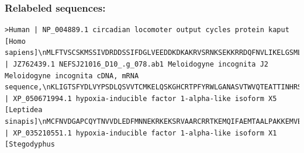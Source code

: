 \documentclass[
  letterpaper,
  DIV=11,
  numbers=noendperiod]{scrartcl}
\begin{document}
\hypertarget{relabeled-sequences}{%
\subsubsection{Relabeled sequences:}\label{relabeled-sequences}}

\begin{verbatim}
>Human | NP_004889.1 circadian locomoter output cycles protein kaput [Homo sapiens]\nMLFTVSCSKMSSIVDRDDSSIFDGLVEEDDKDKAKRVSRNKSEKKRRDQFNVLIKELGSMLPGNARKMDK\nSTVLQKSIDFLRKHKEITAQSDASEIRQDWKPTFLSNEEFTQLMLEALDGFFLAIMTDGSIIYVSESVTS\nLLEHLPSDLVDQSIFNFIPEGEHSEVYKILSTHLLESDSLTPEYLKSKNQLEFCCHMLRGTIDPKEPSTY\nEYVKFIGNFKSLNSVSSSAHNGFEGTIQRTHRPSYEDRVCFVATVRLATPQFIKEMCTVEEPNEEFTSRH\nSLEWKFLFLDHRAPPIIGYLPFEVLGTSGYDYYHVDDLENLAKCHEHLMQYGKGKSCYYRFLTKGQQWIW\nLQTHYYITYHQWNSRPEFIVCTHTVVSYAEVRAERRRELGIEESLPETAADKSQDSGSDNRINTVSLKEA\nLERFDHSPTPSASSRSSRKSSHTAVSDPSSTPTKIPTDTSTPPRQHLPAHEKMVQRRSSFSSQSINSQSV\nGSSLTQPVMSQATNLPIPQGMSQFQFSAQLGAMQHLKDQLEQRTRMIEANIHRQQEELRKIQEQLQMVHG\nQGLQMFLQQSNPGLNFGSVQLSSGNSSNIQQLAPINMQGQVVPTNQIQSGMNTGHIGTTQHMIQQQTLQS\nTSTQSQQNVLSGHSQQTSLPSQTQSTLTAPLYNTMVISQPAAGSMVQIPSSMPQNSTQSAAVTTFTQDRQ\nIRFSQGQQLVTKLVTAPVACGAVMVPSTMLMGQVVTAYPTFATQQQQSQTLSVTQQQQQQSSQEQQLTSV\nQQPSQAQLTQPPQQFLQTSRLLHGNPSTQLILSAAFPLQQSTFPQSHHQQHQSQQQQQLSRHRTDSLPDP\nSKVQPQ\n\n>Southern_Root_Nematode | JZ762439.1 NEFSJ21016_D10_.g_078.ab1 Meloidogyne incognita J2 Meloidogyne incognita cDNA, mRNA sequence,\nKLIGTSFYDLVYPSDLQSVVTCMKELQSKGHCRTPFYRWLGANASVTWVQTEATTINHRSKGTKGYYVLCTHYVLG\n\n>Wood_White_Butterfly | XP_050671994.1 hypoxia-inducible factor 1-alpha-like isoform X5 [Leptidea sinapis]\nMCFNVDGAPCQYTNVVDLEDFMNNEKRKEKSRVAARCRRTKEMQIFAEMTAALPAKKEMVEQLDKSSVMRLAISYLRVRD\nIVSLLPADTEPPKLKSPKGLEEIQSELSYMKALDGFVLVLSQQGDIIYCSDNITEHLGVSQMEIMGQSVFEFSHPCDHEE\nIREALRSNGAGRRDLLLRLKCTLTSKGRNVHIKSASYKVIHMTGHMLTPDKESNNNDEEGKKDLKKPTNGALIAVGRPIP\nHPSNIEVPLDTKTFLTKHSLDMKFTYTDEGLLNALGFESDELVGCSLYDYHHAADSASLVQQFKSLFSKGQCETGQYRFL\nGKSGGYAWIQTQATVITDKQQKPSFVVCVNYVISGIECKDEVFAAHQVQHADLKPAVAALPATAVPICDNPAPANGAIVG\nVILPEEERPIPVTELIFAPREKEMNKGFLMFSQNKGITSEWMLNRDSLVLKDEPEDLTHLAPTAGDAHILLENSPFDMFD\nDFILNDNYCSLLGDDLANGSPVDSLIGDSLLSSPERQENESTGEQSSLLTELSLDAFDSARSDTDIDDGNSPFIPTTDEL\nPVLEPAVMWGALPDSVRQARPQPSEIQSSSPALQRLLVAPPTGPPPQDIITNIYSEQGLIPSRNISSWDTGVKRIMKQEE\nEPTAKRIKRSPTPTPTQTSTSSSVLMNLLVSGCDVDAGYICMVQCRPRHKAKA\n\n>African_Social_Spider | XP_035210551.1 hypoxia-inducible factor 1-alpha-like isoform X1 [Stegodyphus 
\end{verbatim}
\end{document}
